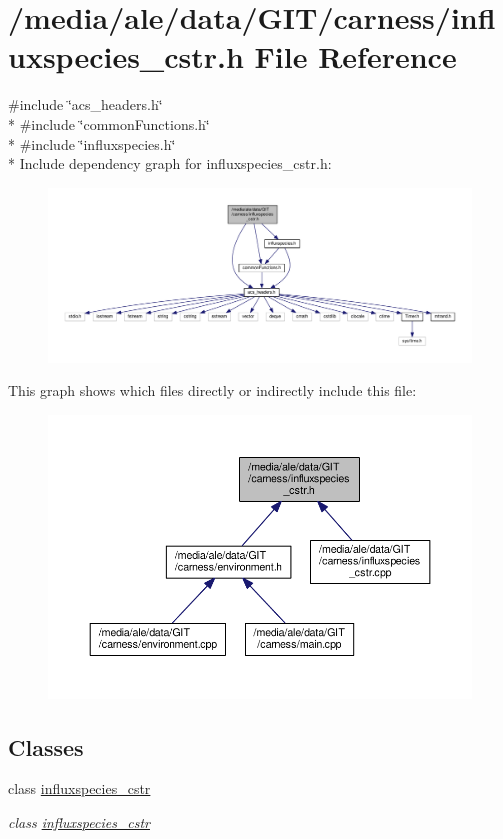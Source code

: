 \hypertarget{a00078}{\section{/media/ale/data/\-G\-I\-T/carness/influxspecies\-\_\-cstr.h File Reference}
\label{a00078}
}
{\ttfamily \#include \char`\"{}acs\-\_\-headers.\-h\char`\"{}}\\*
{\ttfamily \#include \char`\"{}common\-Functions.\-h\char`\"{}}\\*
{\ttfamily \#include \char`\"{}influxspecies.\-h\char`\"{}}\\*
Include dependency graph for influxspecies\-\_\-cstr.\-h\-:\nopagebreak
\begin{figure}[H]
\begin{center}
\leavevmode
\includegraphics[width=350pt]{a00149}
\end{center}
\end{figure}
This graph shows which files directly or indirectly include this file\-:\nopagebreak
\begin{figure}[H]
\begin{center}
\leavevmode
\includegraphics[width=350pt]{a00150}
\end{center}
\end{figure}
\subsection*{Classes}
\begin{DoxyCompactItemize}
\item 
class \hyperlink{a00006}{influxspecies\-\_\-cstr}
\begin{DoxyCompactList}\small\item\em class \hyperlink{a00006}{influxspecies\-\_\-cstr} \end{DoxyCompactList}\end{DoxyCompactItemize}
